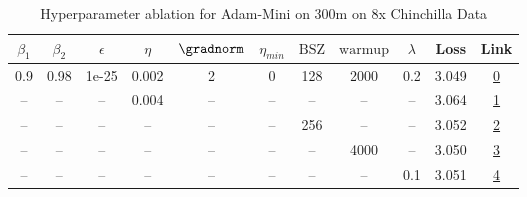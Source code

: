 \begin{table}[H]
\centering
\caption{Hyperparameter ablation for Adam-Mini on 300m on 8x Chinchilla Data}
\label{tab:ablation_adam-mini_300m_on_8x_chinchilla_data}
\begin{tabular}{ccccccccccc}
\toprule
$\beta_1$ & $\beta_2$ & $\epsilon$ & $\eta$ & $\gradnorm$ & $\eta_{min}$ & $\mathrm{BSZ}$ & $\mathrm{warmup}$ & $\lambda$ & Loss & Link \\
\midrule
0.9 & 0.98 & 1e-25 & 0.002 & 2 & 0 & 128 & 2000 & 0.2 & 3.049 & \href{https://wandb.ai/stanford-mercury/optimizer-scaling/runs/sweep-300m-48B-minic8695flr0.002-wd0.2-minlr0-warmup2000-b10.9-b-952cc4}{0} \\
\midrule
-- & -- & -- & 0.004 & -- & -- & -- & -- & -- & 3.064 & \href{https://wandb.ai/stanford-mercury/optimizer-scaling/runs/sweep-300m-48B-minid13807lr0.004-wd0.2-minlr0-warmup2000-b10.9-b-c8b391}{1} \\
-- & -- & -- & -- & -- & -- & 256 & -- & -- & 3.052 & \href{https://wandb.ai/stanford-mercury/optimizer-scaling/runs/sweep-300m-48B-mini54b665lr0.002-wd0.2-minlr0-warmup2000-b10.9-b-bb57bb}{2} \\
-- & -- & -- & -- & -- & -- & -- & 4000 & -- & 3.050 & \href{https://wandb.ai/stanford-mercury/optimizer-scaling/runs/sweep-300m-48B-mini8ec643lr0.002-wd0.2-minlr0-warmup4000-b10.9-b-efe5ba}{3} \\
-- & -- & -- & -- & -- & -- & -- & -- & 0.1 & 3.051 & \href{https://wandb.ai/stanford-mercury/optimizer-scaling/runs/sweep-300m-48B-mini293878lr0.002-wd0.1-minlr0-warmup2000-b10.9-b-f38163}{4} \\
\bottomrule
\end{tabular}
\end{table}

